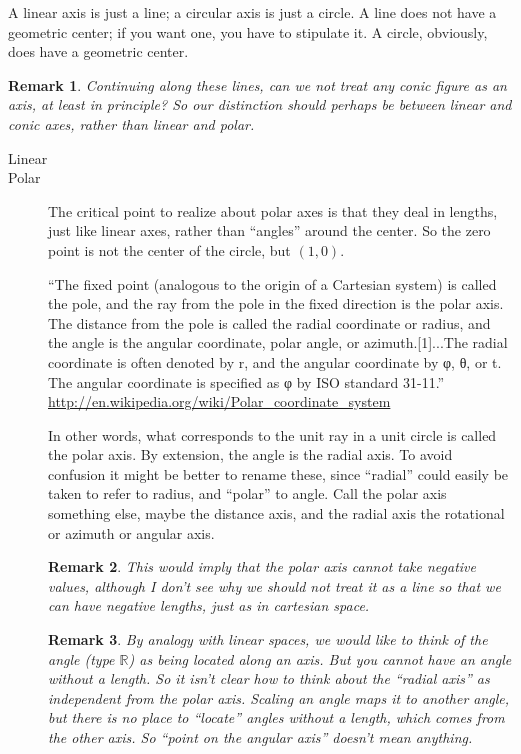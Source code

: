 \documentclass[12pt]{tufte-handout}
\numberwithin{equation}{subsection}
\numberwithin{equation}{subsection}
\newtheorem{remark}{Remark}
\newcommand\R{\(\mathds{R}\)}
\begin{document}
  A linear axis is just a line; a circular axis is just a circle.  A
  line does not have a geometric center; if you want one, you have
  to stipulate it.  A circle, obviously, does have a geometric
  center.

  \begin{remark}
    Continuing along these lines, can we not treat any conic figure
    as an axis, at least in principle?  So our distinction should
    perhaps be between linear and conic axes, rather than linear and
    polar.
  \end{remark}


  \begin{description}
  \item [Linear]
  \item [Polar]

    The critical point to realize about polar axes is that they deal
    in lengths, just like linear axes, rather than ``angles'' around
    the center.  So the zero point is not the center of the circle,
    but \((1,0)\).


    ``The fixed point (analogous to the origin of a
    Cartesian system) is called the pole, and the ray from the pole
    in the fixed direction is the polar axis. The distance from the
    pole is called the radial coordinate or radius, and the angle is
    the angular coordinate, polar angle, or azimuth.[1]...The radial
    coordinate is often denoted by r, and the angular coordinate by
    φ, θ, or t. The angular coordinate is specified as φ by ISO
    standard 31-11.''
    \url{http://en.wikipedia.org/wiki/Polar_coordinate_system}

    In other words, what corresponds to the unit ray in a unit
    circle is called the polar axis.  By extension, the angle is the
    radial axis.  To avoid confusion it might be better to rename
    these, since ``radial'' could easily be taken to refer to
    radius, and ``polar'' to angle.  Call the polar axis something
    else, maybe the distance axis, and the radial axis the
    rotational or azimuth or angular axis.

    \begin{remark}
      This would imply that the polar axis cannot take negative
      values, although I don't see why we should not treat it as a
      line so that we can have negative lengths, just as in
      cartesian space.
    \end{remark}


    \begin{remark}
      By analogy with linear spaces, we would like to think of the
      angle (type \R) as being located along an axis.  But you
      cannot have an angle without a length.  So it isn't clear how
      to think about the ``radial axis'' as independent from the
      polar axis.  Scaling an angle maps it to another angle, but
      there is no place to ``locate'' angles without a length, which
      comes from the other axis.  So ``point on the angular axis''
      doesn't mean anything.


\end{remark}
\end{description}
\end{document}
